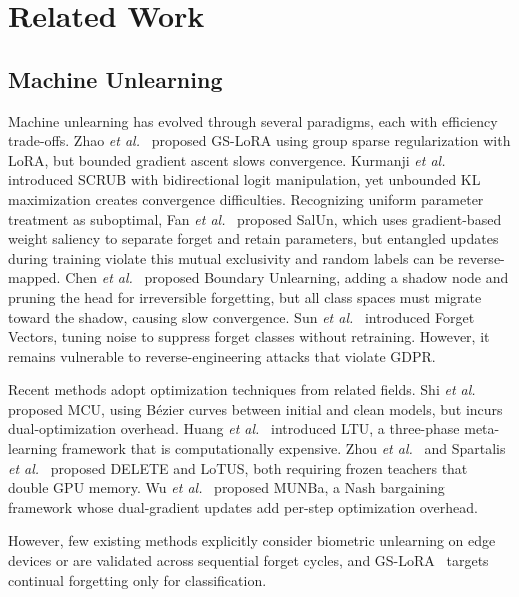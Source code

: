 \section{Related Work}
\label{2}
\subsection{Machine Unlearning}
Machine unlearning has evolved through several paradigms, each with efficiency trade-offs. Zhao \textit{et al.}~\cite{zhao2024continual} proposed GS-LoRA using group sparse regularization with LoRA, but bounded gradient ascent slows convergence. Kurmanji \textit{et al.}~\cite{kurmanji2023towards} introduced SCRUB with bidirectional logit manipulation, yet unbounded KL maximization creates convergence difficulties. Recognizing uniform parameter treatment as suboptimal, Fan \textit{et al.}~\cite{fan2023salun} proposed SalUn, which uses gradient-based weight saliency to separate forget and retain parameters, but entangled updates during training violate this mutual exclusivity and random labels can be reverse-mapped. Chen \textit{et al.}~\cite{chen2023boundary} proposed Boundary Unlearning, adding a shadow node and pruning the head for irreversible forgetting, but all class spaces must migrate toward the shadow, causing slow convergence. Sun \textit{et al.}~\cite{sun2024forget} introduced Forget Vectors, tuning noise to suppress forget classes without retraining. However, it remains vulnerable to reverse-engineering attacks that violate GDPR.

Recent methods adopt optimization techniques from related fields. Shi \textit{et al.}~\cite{shi2025mcu} proposed MCU, using Bézier curves between initial and clean models, but incurs dual-optimization overhead. Huang \textit{et al.}~\cite{huang2024learning} introduced LTU, a three-phase meta-learning framework that is computationally expensive. Zhou \textit{et al.}~\cite{zhou2025decoupled} and Spartalis \textit{et al.}~\cite{spartalis2025lotus} proposed DELETE and LoTUS, both requiring frozen teachers that double GPU memory. Wu \textit{et al.}~\cite{wu2025munba} proposed MUNBa, a Nash bargaining framework whose dual-gradient updates add per-step optimization overhead.

However, few existing methods explicitly consider biometric unlearning on edge devices or are validated across sequential forget cycles, and GS-LoRA~\cite{zhao2024continual} targets continual forgetting only for classification.

